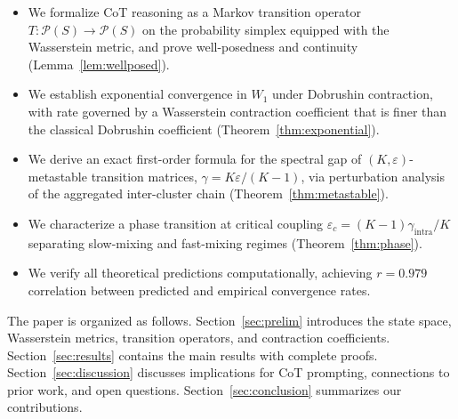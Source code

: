\begin{itemize}[leftmargin=*,itemsep=2pt,topsep=4pt]
\item We formalize CoT reasoning as a Markov transition operator
  $T \colon \mathcal{P}(S) \to \mathcal{P}(S)$ on the probability simplex
  equipped with the Wasserstein metric, and prove well-posedness and continuity
  (Lemma~\ref{lem:wellposed}).

\item We establish exponential convergence in $W_1$ under Dobrushin contraction,
  with rate governed by a Wasserstein contraction coefficient that is finer than
  the classical Dobrushin coefficient (Theorem~\ref{thm:exponential}).

\item We derive an exact first-order formula for the spectral gap of
  $(K,\varepsilon)$-metastable transition matrices, $\gamma = K\varepsilon/(K-1)$,
  via perturbation analysis of the aggregated inter-cluster chain
  (Theorem~\ref{thm:metastable}).

\item We characterize a phase transition at critical coupling
  $\varepsilon_c = (K-1)\gamma_{\mathrm{intra}}/K$ separating slow-mixing and
  fast-mixing regimes (Theorem~\ref{thm:phase}).

\item We verify all theoretical predictions computationally, achieving
  $r = 0.979$ correlation between predicted and empirical convergence rates.
\end{itemize}

The paper is organized as follows. Section~\ref{sec:prelim} introduces the
state space, Wasserstein metrics, transition operators, and contraction
coefficients. Section~\ref{sec:results} contains the main results with
complete proofs. Section~\ref{sec:discussion} discusses implications for CoT
prompting, connections to prior work, and open questions.
Section~\ref{sec:conclusion} summarizes our contributions.
